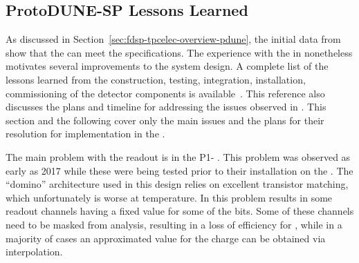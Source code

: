 \subsection{ProtoDUNE-SP Lessons Learned}
\label{sec:fdsp-tpcelec-overview-lessons}

As discussed in %
Section~\ref{sec:fdsp-tpcelec-overview-pdune}, the initial data from 
show that the  %
can meet the  %
specifications. %
The experience with the  in  nonetheless motivates several improvements %
to the  system design.  %
A complete list of the lessons learned from the construction, testing, integration,
installation, commissioning of the  detector components
is available~\cite{bib:docdb12367}. This reference also discusses %
the plans and timeline for addressing the issues 
observed in . %
This  section and the following cover only the main issues  %
and the plans for their resolution  
for implementation in the . %

The main problem with the   readout is in the
P1- . This problem was observed as early as 2017 %
while these  were being tested prior to their installation
on the . %
The ``domino'' architecture used in this design relies on
excellent transistor matching, which %
unfortunately %
is worse at  temperature. In  this problem
results in some readout channels having a fixed value for some of
the  bits. Some of these channels need to be masked 
from analysis, resulting in a loss of efficiency for , while
in a majority of cases an approximated value for the charge can
be obtained via interpolation. 

